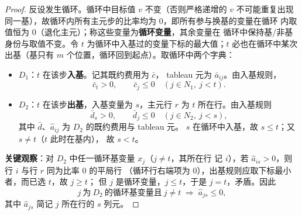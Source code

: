 \begin{proof}
反设发生循环。循环中目标值 $v$ 不变（否则严格递增的 $v$ 不可能重复出现
同一基），故循环内所有主元步的比率均为 $0$，即所有参与换基的变量在循环
内取值恒为 $0$（退化主元）；称这些变量为\textbf{循环变量}，其余变量在
循环中保持基/非基身份与取值不变。令
$t$ 为循环中入基过的变量下标的最大值；$t$ 必也在循环中某次出基（基只有
$m$ 个位置，循环回到起点）。取循环中两个字典：
\begin{itemize}
  \item $D_1$：$t$ 在该步\textbf{入基}。记其既约费用为 $\bar c$，
        tableau 元为 $\bar a_{ij}$。由入基规则，
        \begin{equation}\label{eq:thlp-bland-d1}
          \bar c_t>0,\qquad \bar c_j\le0\quad(j\in N_1,\ j<t).
        \end{equation}
  \item $D_2$：$t$ 在该步\textbf{出基}，入基变量为 $s$，主元行 $r$ 为
        $t$ 所在行。由入基规则
        \begin{equation}\label{eq:thlp-bland-d2}
          \bar d_s>0,\qquad \bar d_j\le0\quad(j\in N_2,\ j<s),
        \end{equation}
        其中 $\bar d$、$\hat a_{ij}$ 为 $D_2$ 的既约费用与 tableau 元。
        $s$ 在循环中入基，故 $s\le t$；又 $s\ne t$（$t$ 此时在基内），
        故 $s<t$。
\end{itemize}
\textbf{关键观察}：对 $D_2$ 中任一循环基变量 $x_j$（$j\ne t$，其所在行
记 $i$），若 $\hat a_{is}>0$，则行 $i$ 与行 $r$ 同为比率 $0$ 的平局行
（循环行右端项为 $0$），出基规则应取下标最小者，而已选 $t$，故 $j\ge t$；
但 $j$ 是循环变量，$j\le t$，于是 $j=t$，矛盾。因此
\begin{equation}\label{eq:thlp-bland-rowsign}
  j\ \text{为}\ D_2\ \text{的循环基变量且}\ j\ne t
  \;\Longrightarrow\; \hat a_{js}\le0 ,
\end{equation}
其中 $\hat a_{js}$ 简记 $j$ 所在行的 $s$ 列元。


\end{proof}

